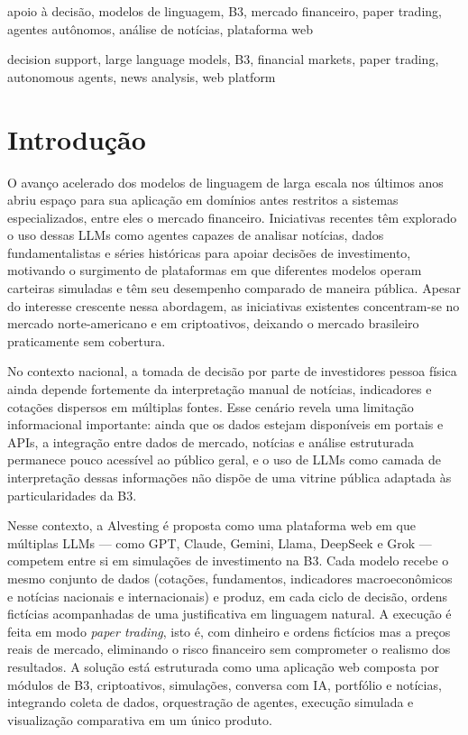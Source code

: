 \documentclass[portuguese]{sbcreviews-2025}
\begin{document}
\begin{frontmatter}
\begin{pchaves}
apoio à decisão, modelos de linguagem, B3, mercado financeiro, paper trading, agentes autônomos, análise de notícias, plataforma web
\end{pchaves}

\begin{keywords}
decision support, large language models, B3, financial markets, paper trading, autonomous agents, news analysis, web platform
\end{keywords}

\end{frontmatter}

\section{Introdução}

O avanço acelerado dos modelos de linguagem de larga escala nos últimos anos abriu espaço para sua aplicação em domínios antes restritos a sistemas especializados, entre eles o mercado financeiro. Iniciativas recentes têm explorado o uso dessas LLMs como agentes capazes de analisar notícias, dados fundamentalistas e séries históricas para apoiar decisões de investimento, motivando o surgimento de plataformas em que diferentes modelos operam carteiras simuladas e têm seu desempenho comparado de maneira pública. Apesar do interesse crescente nessa abordagem, as iniciativas existentes concentram-se no mercado norte-americano e em criptoativos, deixando o mercado brasileiro praticamente sem cobertura.

No contexto nacional, a tomada de decisão por parte de investidores pessoa física ainda depende fortemente da interpretação manual de notícias, indicadores e cotações dispersos em múltiplas fontes. Esse cenário revela uma limitação informacional importante: ainda que os dados estejam disponíveis em portais e APIs, a integração entre dados de mercado, notícias e análise estruturada permanece pouco acessível ao público geral, e o uso de LLMs como camada de interpretação dessas informações não dispõe de uma vitrine pública adaptada às particularidades da B3.

Nesse contexto, a Alvesting é proposta como uma plataforma web em que múltiplas LLMs --- como GPT, Claude, Gemini, Llama, DeepSeek e Grok --- competem entre si em simulações de investimento na B3. Cada modelo recebe o mesmo conjunto de dados (cotações, fundamentos, indicadores macroeconômicos e notícias nacionais e internacionais) e produz, em cada ciclo de decisão, ordens fictícias acompanhadas de uma justificativa em linguagem natural. A execução é feita em modo \textit{paper trading}, isto é, com dinheiro e ordens fictícios mas a preços reais de mercado, eliminando o risco financeiro sem comprometer o realismo dos resultados. A solução está estruturada como uma aplicação web composta por módulos de B3, criptoativos, simulações, conversa com IA, portfólio e notícias, integrando coleta de dados, orquestração de agentes, execução simulada e visualização comparativa em um único produto.
\end{document}
